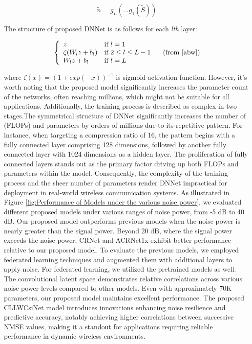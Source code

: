 \documentclass[lettersize,journal]{IEEEtran}
\begin{document}
\begin{equation}
		\tilde{n}=g_{L}(...g_{1}(\tilde{S})) 
\end{equation}

The structure of proposed DNNet is as follows for each \textit{lth} 
layer:

\begin{equation}
\left\{
\begin{array}{ll}
	z  & \mbox{if } l=1 \\
	\zeta(W_{l}z+b_{l}) & \mbox{if } 2\le l \le L-1  \\
	W_{l}z+b_{l} & \mbox{if } l=L  
\end{array} 
\right.
	\label{eqn:dnnfunction}
	 \quad (\text{from \cite{abw}})
\end{equation}

where \begin{math}  \zeta(x)=(1+exp(-x))^{-1} \end{math} is sigmoid activation function.
However, it's worth noting that the proposed model significantly increases the parameter count of the networks, often reaching millions, which might not be suitable for all applications. Additionally, the training process is described as complex in two stages.The symmetrical structure of DNNet significantly increases the number of (FLOPs) and parameters by orders of millions due to its repetitive pattern. For instance, when targeting a compression ratio of 16, the pattern begins with a fully connected layer comprising 128 dimensions, followed by another fully connected layer with 1024 dimensions as a hidden layer. The proliferation of fully connected layers stands out as the primary factor driving up both FLOPs and parameters within the model. Consequently, the complexity of the training process and the sheer number of parameters render DNNet impractical for deployment in real-world wireless communication systems.
As illustrated in Figure \ref{fig:Performance of Models under the various noise power}, we evaluated different proposed models under various ranges of noise power, from -5 dB to 40 dB. Our proposed model outperforms previous models when the noise power is nearly greater than the signal power. Beyond 20 dB, where the signal power exceeds the noise power, CRNet \cite{abn} and ACRNet1x \cite{abx} exhibit better performance relative to our proposed model. To evaluate the previous models, we employed federated learning techniques and augmented them with additional layers to apply noise. For federated learning, we utilized the pretrained models as well. The convolutional latent space demonstrates relative correlations across various noise power levels compared to other models. Even with approximately 70K parameters, our proposed model maintains excellent performance. The proposed CLLWCsiNet model introduces innovations enhancing noise resilience and predictive accuracy, notably achieving higher correlations between successive NMSE values, making it a standout for applications requiring reliable performance in dynamic wireless environments.
\end{document}
